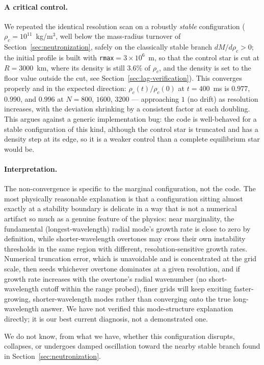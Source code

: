 \documentclass[11pt]{article}
\begin{document}
\paragraph{A critical control.} We repeated the identical resolution scan on a robustly \emph{stable} configuration ($\rho_c=10^{11}$~kg/m$^3$, well below the mass-radius turnover of Section~\ref{sec:neutronization}, safely on the classically stable branch $dM/d\rho_c>0$; the initial profile is built with \texttt{rmax}$=3\times10^{6}$~m, so that the control star is cut at $R=3000$~km, where its density is still $3.6\%$ of $\rho_c$, and the density is set to the floor value outside the cut, see Section~\ref{sec:lag-verification}). This converges properly and in the expected direction: $\rho_c(t)/\rho_c(0)$ at $t=400$~ms is $0.977$, $0.990$, and $0.996$ at $N=800$, $1600$, $3200$ --- approaching $1$ (no drift) as resolution increases, with the deviation shrinking by a consistent factor at each doubling. This argues against a generic implementation bug: the code is well-behaved for a stable configuration of this kind, although the control star is truncated and has a density step at its edge, so it is a weaker control than a complete equilibrium star would be.

\paragraph{Interpretation.} The non-convergence is specific to the marginal configuration, not the code. The most physically reasonable explanation is that a configuration sitting almost exactly at a stability boundary is delicate in a way that is not a numerical artifact so much as a genuine feature of the physics: near marginality, the fundamental (longest-wavelength) radial mode's growth rate is close to zero by definition, while shorter-wavelength overtones may cross their own instability thresholds in the same region with different, resolution-sensitive growth rates. Numerical truncation error, which is unavoidable and is concentrated at the grid scale, then seeds whichever overtone dominates at a given resolution, and if growth rate increases with the overtone's radial wavenumber (no short-wavelength cutoff within the range probed), finer grids will keep exciting faster-growing, shorter-wavelength modes rather than converging onto the true long-wavelength answer. We have not verified this mode-structure explanation directly; it is our best current diagnosis, not a demonstrated one.

We do not know, from what we have, whether this configuration disrupts, collapses, or undergoes damped oscillation toward the nearby stable branch found in Section~\ref{sec:neutronization}.
\end{document}
